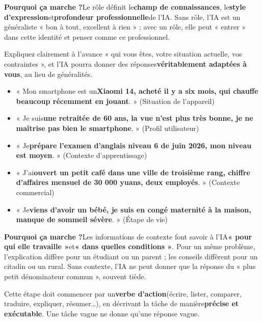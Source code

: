 \textbf{Pourquoi ça marche ?}Le rôle définit le\textbf{champ de connaissances}, le\textbf{style d’expression}et\textbf{profondeur professionnelle}de l’IA. Sans rôle, l’IA est un généraliste « bon à tout, excellent à rien » ; avec un rôle, elle peut « entrer » dans cette identité et penser comme ce professionnel.


Expliquez clairement à l’avance « qui vous êtes, votre situation actuelle, vos contraintes », et l’IA pourra donner des réponses\textbf{véritablement adaptées à vous}, au lieu de généralités.


\begin{itemize}
  \item « Mon smartphone est un\textbf{Xiaomi 14, acheté il y a six mois, qui chauffe beaucoup récemment en jouant}. » (Situation de l’appareil)
  \item « Je suis\textbf{une retraitée de 60 ans, la vue n’est plus très bonne, je ne maîtrise pas bien le smartphone}. » (Profil utilisateur)
  \item « Je\textbf{prépare l’examen d’anglais niveau 6 de juin 2026, mon niveau est moyen}. » (Contexte d’apprentissage)
  \item « J’ai\textbf{ouvert un petit café dans une ville de troisième rang, chiffre d’affaires mensuel de 30 000 yuans, deux employés}. » (Contexte commercial)
  \item « Je\textbf{viens d’avoir un bébé, je suis en congé maternité à la maison, manque de sommeil sévère}. » (Étape de vie)
\end{itemize}

\textbf{Pourquoi ça marche ?}Les informations de contexte font savoir à l’IA\textbf{« pour qui elle travaille »}et\textbf{« dans quelles conditions »}. Pour un même problème, l’explication diffère pour un étudiant ou un parent ; les conseils diffèrent pour un citadin ou un rural. Sans contexte, l’IA ne peut donner que la réponse du « plus petit dénominateur commun », souvent tiède.


Cette étape doit commencer par un\textbf{verbe d’action}(écrire, lister, comparer, traduire, expliquer, résumer…), en décrivant la tâche de manière\textbf{précise et exécutable}. Une tâche vague ne donne qu’une réponse vague.

